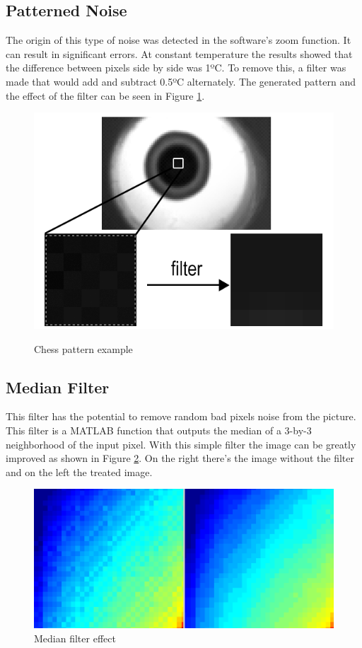 \subsection{Patterned Noise}

\par The origin of this type of noise was detected in the software's zoom function. It can result in significant errors. At constant temperature the results showed that the  difference between pixels side by side was 1ºC. To remove this, a filter was made that would add and subtract 0.5ºC alternately. The generated pattern and the effect of the filter can be seen in Figure \ref{fig:chess}.

\begin{figure}[h]
\centering
\includegraphics[width=0.5\linewidth]{Figures/4.Chapter/chess2.png}\\
%

\caption{Chess pattern example}
\label{fig:chess}
\end{figure}


\subsection{Median Filter}

\par This filter has the potential to remove random bad pixels noise from the picture. This filter is a MATLAB function that outputs the median of a 3-by-3 neighborhood of the input pixel. With this simple filter the image can be greatly improved as shown in Figure \ref{fig:median}. On the right there's the image without the filter and on the left the treated image.

\begin{figure}[h]
\centering
\includegraphics[width=0.6\linewidth]{Figures/4.Chapter/median.png}
\caption{Median filter effect}
\label{fig:median}
\end{figure}

